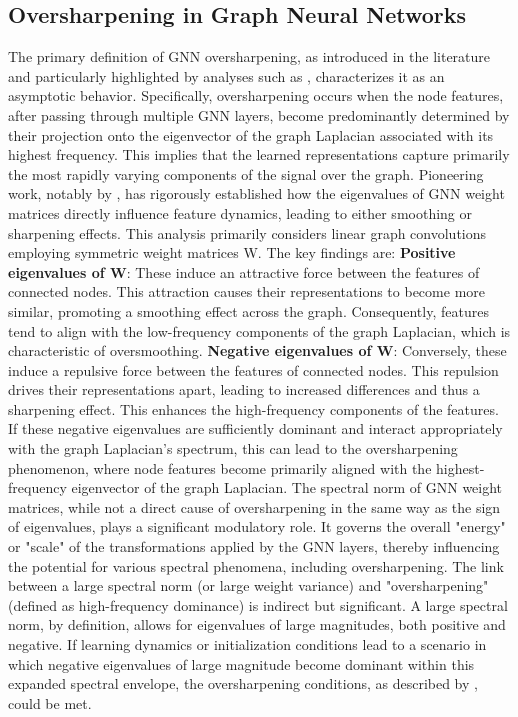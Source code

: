 \subsection{Oversharpening in Graph Neural Networks}
\label{subsec:oversharpening}
The primary definition of GNN oversharpening, as introduced in the literature and particularly highlighted by analyses such as \cite{GRAFF}, characterizes it as an asymptotic behavior. Specifically, oversharpening occurs when the node features, after passing through multiple GNN layers, become predominantly determined by their projection onto the eigenvector of the graph Laplacian associated with its highest frequency. This implies that the learned representations capture primarily the most rapidly varying components of the signal over the graph.
Pioneering work, notably by \cite{GRAFF}, has rigorously established how the eigenvalues of GNN weight matrices directly influence feature dynamics, leading to either smoothing or sharpening effects. This analysis primarily considers linear graph convolutions employing symmetric weight matrices W.
The key findings are:
\textbf{Positive eigenvalues of W}: These induce an attractive force between the features of connected nodes. This attraction causes their representations to become more similar, promoting a smoothing effect across the graph. Consequently, features tend to align with the low-frequency components of the graph Laplacian, which is characteristic of oversmoothing.
\textbf{Negative eigenvalues of W}: Conversely, these induce a repulsive force between the features of connected nodes. This repulsion drives their representations apart, leading to increased differences and thus a sharpening effect. This enhances the high-frequency components of the features. If these negative eigenvalues are sufficiently dominant and interact appropriately with the graph Laplacian's spectrum, this can lead to the oversharpening phenomenon, where node features become primarily aligned with the highest-frequency eigenvector of the graph Laplacian.
The spectral norm of GNN weight matrices, while not a direct cause of oversharpening in the same way as the sign of eigenvalues, plays a significant modulatory role. It governs the overall "energy" or "scale" of the transformations applied by the GNN layers, thereby influencing the potential for various spectral phenomena, including oversharpening.
The link between a large spectral norm (or large weight variance) and "oversharpening" (defined as high-frequency dominance) is indirect but significant. 
A large spectral norm, by definition, allows for eigenvalues of large magnitudes, both positive and negative.
If learning dynamics or initialization conditions lead to a scenario in which negative eigenvalues of large magnitude become dominant within this expanded spectral envelope, the oversharpening conditions, as described by 
\cite{GRAFF}, could be met.


